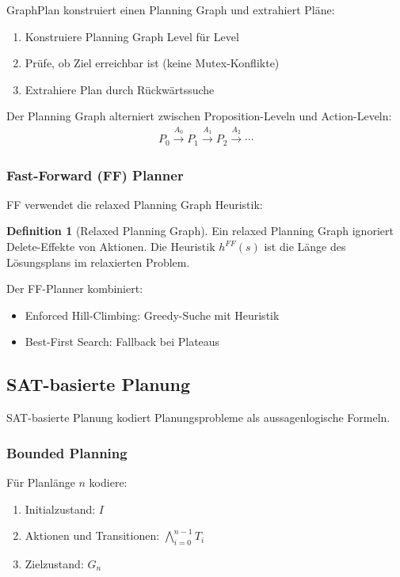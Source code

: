 ﻿\documentclass[a4paper,12pt]{article}
\theoremstyle{definition}
\newtheorem{definition}{Definition}[section]
\begin{document}
GraphPlan konstruiert einen Planning Graph und extrahiert Pläne:

\begin{enumerate}
	\item Konstruiere Planning Graph Level für Level
	\item Prüfe, ob Ziel erreichbar ist (keine Mutex-Konflikte)
	\item Extrahiere Plan durch Rückwärtssuche
\end{enumerate}

Der Planning Graph alterniert zwischen Proposition-Leveln und Action-Leveln:
\begin{align}
P_0 \xrightarrow{A_0} P_1 \xrightarrow{A_1} P_2 \xrightarrow{A_2} \cdots
\end{align}

\subsubsection{Fast-Forward (FF) Planner}

FF verwendet die relaxed Planning Graph Heuristik:

\begin{definition}[Relaxed Planning Graph]
	Ein relaxed Planning Graph ignoriert Delete-Effekte von Aktionen. Die Heuristik $h^{FF}(s)$ ist die Länge des Lösungsplans im relaxierten Problem.
\end{definition}

Der FF-Planner kombiniert:
\begin{itemize}
	\item[-] Enforced Hill-Climbing: Greedy-Suche mit Heuristik
	\item[-] Best-First Search: Fallback bei Plateaus
\end{itemize}

\subsection{SAT-basierte Planung}

SAT-basierte Planung kodiert Planungsprobleme als aussagenlogische Formeln.

\subsubsection{Bounded Planning}

Für Planlänge $n$ kodiere:
\begin{enumerate}
	\item Initialzustand: $I$
	\item Aktionen und Transitionen: $\bigwedge_{i=0}^{n-1} T_i$
	\item Zielzustand: $G_n$
\end{enumerate}
\end{document}
